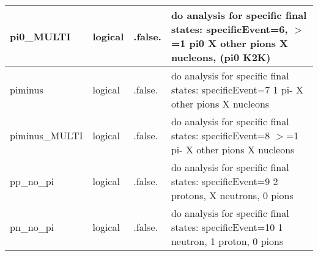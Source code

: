 \documentclass{article}
\begin{document}
\begin{longtable}{llll}
\midrule
pi0\_MULTI & \begin{minipage}[t]{2cm}logical\end{minipage} & \begin{minipage}[t]{2cm}.false.\end{minipage} & \begin{minipage}[t]{12cm}do analysis for specific final states: specificEvent=6, $>$=1 pi0  X other pions X nucleons, (pi0 K2K)\end{minipage}\\*
\midrule
piminus & \begin{minipage}[t]{2cm}logical\end{minipage} & \begin{minipage}[t]{2cm}.false.\end{minipage} & \begin{minipage}[t]{12cm}do analysis for specific final states: specificEvent=7 1 pi-  X other pions X nucleons\end{minipage}\\*
\midrule
piminus\_MULTI & \begin{minipage}[t]{2cm}logical\end{minipage} & \begin{minipage}[t]{2cm}.false.\end{minipage} & \begin{minipage}[t]{12cm}do analysis for specific final states: specificEvent=8 $>$=1 pi-  X other pions X nucleons\end{minipage}\\*
\midrule
pp\_no\_pi & \begin{minipage}[t]{2cm}logical\end{minipage} & \begin{minipage}[t]{2cm}.false.\end{minipage} & \begin{minipage}[t]{12cm}do analysis for specific final states:  specificEvent=9 2 protons, X neutrons, 0 pions\end{minipage}\\*
\midrule
pn\_no\_pi & \begin{minipage}[t]{2cm}logical\end{minipage} & \begin{minipage}[t]{2cm}.false.\end{minipage} & \begin{minipage}[t]{12cm}do analysis for specific final states: specificEvent=10 1 neutron, 1 proton, 0 pions\end{minipage}\\*

\end{longtable}
\end{document}

